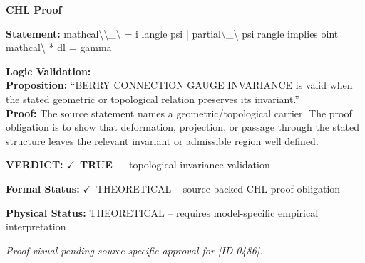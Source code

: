\vspace{0.45em}
\noindent\textbf{CHL Proof}\par
\textbf{Statement:} mathcal\textbackslash{}\textbackslash{}\_\textbackslash{} = i langle psi | partial\textbackslash{}\_\textbackslash{} psi rangle implies oint mathcal\textbackslash{} * dl = gamma

\textbf{Logic Validation:}\\
\textbf{Proposition:} ``BERRY CONNECTION GAUGE INVARIANCE is valid when the stated geometric or topological
relation preserves its invariant.''\\
\textbf{Proof:} The source statement names a geometric/topological carrier. The proof obligation is to
show that deformation, projection, or passage through the stated structure leaves the
relevant invariant or admissible region well defined.

\textbf{VERDICT:} \ensuremath{\checkmark}\ \textbf{TRUE} --- topological-invariance validation

\textbf{Formal Status:} \ensuremath{\checkmark}\ THEORETICAL -- source-backed CHL proof obligation

\textbf{Physical Status:} THEORETICAL -- requires model-specific empirical interpretation
\par\vspace{0.45em}
\par
\vfill
\begingroup\footnotesize\itshape
Proof visual pending source-specific approval for [ID 0486].
\par\endgroup
\vfill
\endgroup
\endgroup
